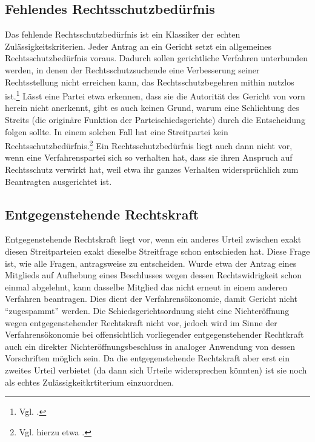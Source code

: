 \subsection{Fehlendes Rechtsschutzbedürfnis}
\label{Zulaessigkeit:Nichtvorliegen:Rechtsschutzbeduerfnis}
Das fehlende Rechtsschutzbedürfnis ist ein Klassiker der echten Zulässigkeitskriterien.
Jeder Antrag an ein Gericht setzt ein allgemeines Rechtsschutzbedürfnis voraus.
Dadurch sollen gerichtliche Verfahren unterbunden werden, in denen der Rechtsschutzsuchende eine Verbesserung seiner Rechtsstellung nicht erreichen kann, das Rechtsschutzbegehren mithin nutzlos ist.\footnote{Vgl. \cite{BVerfGE61126}.}
Lässt eine Partei etwa erkennen, dass sie die Autorität des Gericht von vorn herein nicht anerkennt, gibt es auch keinen Grund, warum eine Schlichtung des Streits (die originäre Funktion der Parteischiedsgerichte) durch die Entscheidung folgen sollte.
In einem solchen Fall hat eine Streitpartei kein Rechtsschutzbedürfnis.\footnote{Vgl. hierzu etwa \cites{FGHE4K140613}{VGFFO7K62610}.}
Ein Rechtsschutzbedürfnis liegt auch dann nicht vor, wenn eine Verfahrenspartei sich so verhalten hat, dass sie ihren Anspruch auf Rechtsschutz verwirkt hat, weil etwa ihr ganzes Verhalten widersprüchlich zum Beantragten ausgerichtet ist.

\subsection{Entgegenstehende Rechtskraft}
\label{Zulaessigkeit:Nichtvorliegen:Rechtskraft}
Entgegenstehende Rechtskraft liegt vor, wenn ein anderes Urteil zwischen exakt diesen Streitparteien exakt dieselbe Streitfrage schon entschieden hat.
Diese Frage ist, wie alle Fragen, antragsweise zu entscheiden.
Wurde etwa der Antrag eines Mitglieds auf Aufhebung eines Beschlusses wegen dessen Rechtswidrigkeit schon einmal abgelehnt, kann dasselbe Mitglied das nicht erneut in einem anderen Verfahren beantragen.
Dies dient der Verfahrensökonomie, damit Gericht nicht \enquote{zugespammt} werden.
Die Schiedsgerichtsordnung sieht eine Nichteröffnung wegen entgegenstehender Rechtskraft nicht vor, jedoch wird im Sinne der Verfahrensökonomie bei offensichtlich vorliegender entgegenstehender Rechtkraft auch ein direkter Nichteröffnungsbeschluss in analoger Anwendung von dessen Vorschriften möglich sein.
Da die entgegenstehende Rechtskraft aber erst ein zweites Urteil verbietet (da dann sich Urteile widersprechen könnten) ist sie noch als echtes Zulässigkeitkrtiterium einzuordnen.

